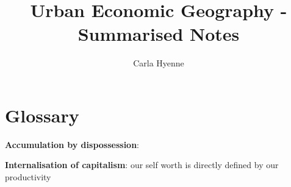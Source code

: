 \documentclass{article}
\title{Urban Economic Geography - Summarised Notes}
\author{Carla Hyenne }
\begin{document}
\maketitle

\tableofcontents

\pagebreak

\section{Glossary}

\textbf{Accumulation by dispossession}:

\textbf{Internalisation of capitalism}: our self worth is directly defined by our productivity
\end{document}
